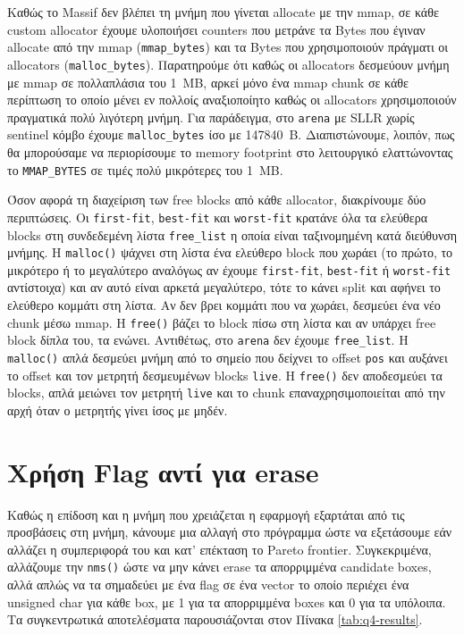 \documentclass[12pt]{article}
\begin{document}
Καθώς το Massif δεν βλέπει τη μνήμη που γίνεται allocate με την mmap, σε κάθε custom allocator έχουμε υλοποιήσει counters που μετράνε τα Bytes που έγιναν allocate από την mmap (\texttt{mmap\_bytes}) και τα Bytes που χρησιμοποιούν πράγματι οι allocators (\texttt{malloc\_bytes}). Παρατηρούμε ότι καθώς οι allocators δεσμεύουν μνήμη με mmap σε πολλαπλάσια του \qty{1}{MB}, αρκεί μόνο ένα mmap chunk σε κάθε περίπτωση το οποίο μένει εν πολλοίς αναξιοποίητο καθώς οι allocators χρησιμοποιούν πραγματικά πολύ λιγότερη μνήμη. Για παράδειγμα, στο \texttt{arena} με SLLR χωρίς sentinel κόμβο έχουμε \texttt{malloc\_bytes} ίσο με \qty{147840}{B}. Διαπιστώνουμε, λοιπόν, πως θα μπορούσαμε να περιορίσουμε το memory footprint στο λειτουργικό ελαττώνοντας το \texttt{MMAP\_BYTES} σε τιμές πολύ μικρότερες του \qty{1}{MB}.

Όσον αφορά τη διαχείριση των free blocks από κάθε allocator, διακρίνουμε δύο περιπτώσεις. Οι \texttt{first-fit}, \texttt{best-fit} και \texttt{worst-fit} κρατάνε όλα τα ελεύθερα blocks στη συνδεδεμένη λίστα \texttt{free\_list} η οποία είναι ταξινομημένη κατά διεύθυνση μνήμης. Η \texttt{malloc()} ψάχνει στη λίστα ένα ελεύθερο block που χωράει (το πρώτο, το μικρότερο ή το μεγαλύτερο αναλόγως αν έχουμε \texttt{first-fit}, \texttt{best-fit} ή \texttt{worst-fit} αντίστοιχα) και αν αυτό είναι αρκετά μεγαλύτερο, τότε το κάνει split και αφήνει το ελεύθερο κομμάτι στη λίστα. Αν δεν βρει κομμάτι που να χωράει, δεσμεύει ένα νέο chunk μέσω mmap. Η \texttt{free()} βάζει το block πίσω στη λίστα και αν υπάρχει free block δίπλα του, τα ενώνει. Αντιθέτως, στο \texttt{arena} δεν έχουμε \texttt{free\_list}. Η \texttt{malloc()} απλά δεσμεύει μνήμη από το σημείο που δείχνει το offset \texttt{pos} και αυξάνει το offset και τον μετρητή δεσμευμένων blocks \texttt{live}. Η \texttt{free()} δεν αποδεσμεύει τα blocks, απλά μειώνει τον μετρητή \texttt{live} και το chunk επαναχρησιμοποιείται από την αρχή όταν ο μετρητής γίνει ίσος με μηδέν.

\section{Χρήση Flag αντί για erase}
Καθώς η επίδοση και η μνήμη που χρειάζεται η εφαρμογή εξαρτάται από τις προσβάσεις στη μνήμη, κάνουμε μια αλλαγή στο πρόγραμμα ώστε να εξετάσουμε εάν αλλάζει η συμπεριφορά του και κατ' επέκταση το Pareto frontier. Συγκεκριμένα, αλλάζουμε την \texttt{nms()} ώστε να μην κάνει erase τα απορριμμένα candidate boxes, αλλά απλώς να τα σημαδεύει με ένα flag σε ένα vector το οποίο περιέχει ένα unsigned char για κάθε box, με 1 για τα απορριμμένα boxes και 0 για τα υπόλοιπα. Τα συγκεντρωτικά αποτελέσματα παρουσιάζονται στον Πίνακα \ref{tab:q4-results}.
\end{document}
